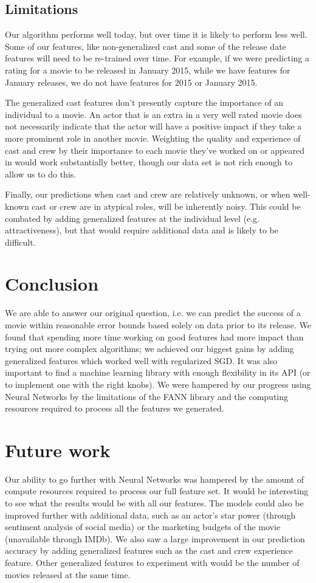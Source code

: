\documentclass[journal]{IEEEtran}
\begin{document}
\subsection{Limitations}

Our algorithm performs well today, but over time it is likely to perform less well.  Some of our features, like non-generalized cast and some of the release date features will need to be re-trained over time.  For example, if we were predicting a rating for a movie to be released in January 2015, while we have features for January releases, we do not have features for 2015 or January 2015.  

The generalized cast features don't presently capture the importance of an individual to a movie.  An actor that is an extra in a very well rated movie does not necessarily indicate that the actor will have a positive impact if they take a more prominent role in another movie.  Weighting the quality and experience of cast and crew by their importance to each movie they've worked on or appeared in would work substantially better, though our data set is not rich enough to allow us to do this.

Finally, our predictions when cast and crew are relatively unknown, or when well-known cast or crew are in atypical roles, will be inherently noisy.  This could be combated by adding generalized features at the individual level (e.g. attractiveness), but that would require additional data and is likely to be difficult.

\section{Conclusion}
We are able to answer our original question, i.e. we can predict the success of a movie within reasonable error bounds based solely on data prior to its release.
We found that spending more time working on good features had more impact than trying out more complex algorithms; we achieved our biggest gains by adding generalized features which worked well with regularized SGD. It was also important to find a machine learning library with enough flexibility in its API (or to implement one with the right knobs). We were hampered by our progress using Neural Networks by the limitations of the FANN library and the computing resources required to process all the features we generated.

\section{Future work}
Our ability to go further with Neural Networks was hampered by the amount of
compute resources required to process our full feature set. It would be
interesting to see what the results would be with all our features. The models
could also be improved further with additional data, such as an actor's star
power (through sentiment analysis of social media) or the marketing budgets of
the movie (unavailable through IMDb). We also saw a large improvement in our
prediction accuracy by adding generalized features such as the cast and crew
experience feature. Other generalized features to experiment with would be the
number of movies released at the same time.
\end{document}
